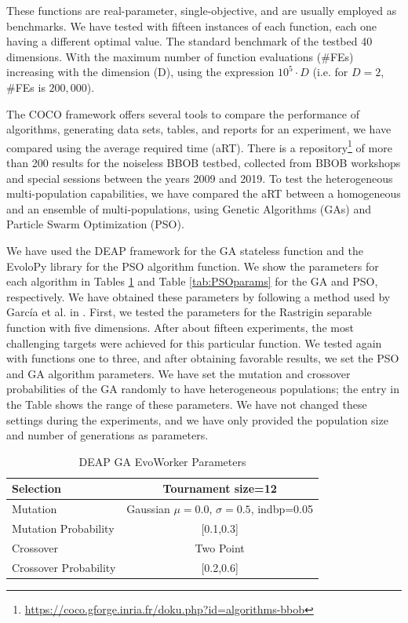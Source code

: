 \documentclass[runningheads]{llncs}
\begin{document}
These functions are real-parameter, single-objective, and are
usually employed as benchmarks. We have tested with fifteen instances of each
function, each one having a different optimal value. The standard benchmark of
the testbed %
40 dimensions. With the maximum number of function evaluations (\#FEs)
increasing with the dimension (D), using the expression $10^5 \cdot D$ (i.e.
for $D = 2$, \#FEs is $200,000$).

The COCO framework offers several tools to compare the performance of
algorithms, generating data sets, tables, and reports for an experiment, we have
compared using the average required time (aRT). There is a
repository\footnote{\url{https://coco.gforge.inria.fr/doku.php?id=algorithms-bbob}}
of more than 200 results for the noiseless BBOB testbed, collected from BBOB
workshops and special sessions between the years 2009 and 2019. To test the
heterogeneous multi-population capabilities, we have compared the aRT between a
homogeneous and an ensemble of multi-populations, using Genetic Algorithms
(GAs) and Particle Swarm Optimization (PSO).

We have used the DEAP framework for the
GA stateless function \cite{fortin2012deap} and the EvoloPy library
\cite{faris2016evolopy} for the PSO algorithm function. We show the parameters
for each algorithm in Tables \ref{tab:GAparams} and Table \ref{tab:PSOparams}
for the GA and PSO, respectively. We have obtained these parameters by following a
method used by García et al. in \cite{garcia2017benchmarking}. First, we
tested the parameters for the Rastrigin separable function with five
dimensions. After about fifteen experiments, the most challenging targets were
achieved for this particular function. We tested again with functions one to
three, and after obtaining favorable results, we set the PSO and GA algorithm
parameters. We have set the mutation and crossover probabilities of the GA randomly
to have heterogeneous populations; the entry in the Table shows the range of these
parameters. We have not changed these settings during the experiments, and we have
only provided the population size and number of generations as parameters.

\begin{table}
  \small
  \caption{ DEAP GA EvoWorker Parameters }
  \label{tab:GAparams} 
  \centering
  \small
  \begin{tabular}{|l|c|}
    \hline
    Selection & Tournament size=12                            \\ \hline
    Mutation & Gaussian $\mu=0.0$, $\sigma=0.5$, indbp=0.05   \\ \hline
    Mutation Probability & [0.1,0.3]                          \\ \hline
    Crossover & Two Point                                     \\ \hline
    Crossover Probability  & [0.2,0.6]                        \\ \hline
  \end{tabular}
\end{table}
\end{document}
